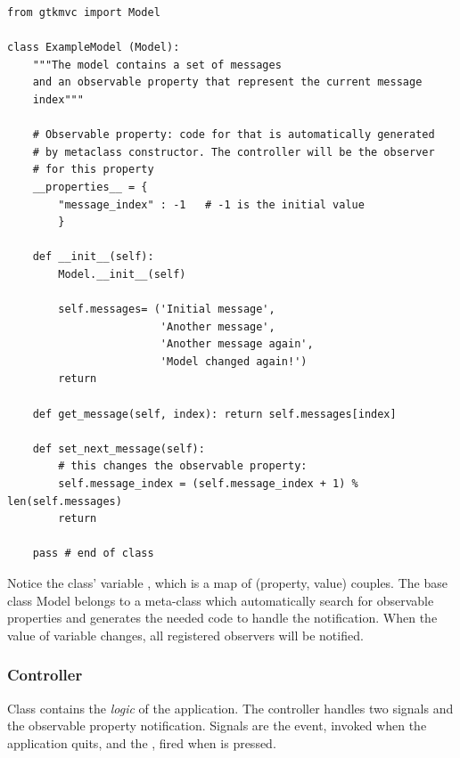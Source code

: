 { \codesize 
\begin{verbatim} 
from gtkmvc import Model

class ExampleModel (Model):
    """The model contains a set of messages
    and an observable property that represent the current message
    index"""

    # Observable property: code for that is automatically generated
    # by metaclass constructor. The controller will be the observer
    # for this property
    __properties__ = {
        "message_index" : -1   # -1 is the initial value
        }

    def __init__(self):
        Model.__init__(self)

        self.messages= ('Initial message',
                        'Another message', 
                        'Another message again',
                        'Model changed again!')
        return

    def get_message(self, index): return self.messages[index]

    def set_next_message(self):
        # this changes the observable property:
        self.message_index = (self.message_index + 1) % len(self.messages)
        return

    pass # end of class

\end{verbatim}
}

Notice the class' variable , which is a
map of (property, value) couples. The base class Model belongs to a
meta-class which automatically search for observable properties and
generates the needed code to handle the notification.  When the value
of variable  changes, all registered
observers will be notified.


\subsubsection{Controller}
Class  contains the \emph{logic} of the
application. The controller handles two signals and the observable
property notification. Signals are the  event,
invoked when the application quits, and the
, fired when  is
pressed.

